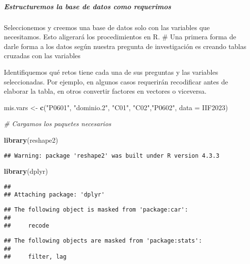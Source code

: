 \documentclass[
]{article}
\newenvironment{Shaded}{\begin{snugshade}}{\end{snugshade}}
\newcommand{\AttributeTok}[1]{\textcolor[rgb]{0.13,0.29,0.53}{#1}}
\newcommand{\CommentTok}[1]{\textcolor[rgb]{0.56,0.35,0.01}{\textit{#1}}}
\newcommand{\FunctionTok}[1]{\textcolor[rgb]{0.13,0.29,0.53}{\textbf{#1}}}
\newcommand{\NormalTok}[1]{#1}
\newcommand{\OtherTok}[1]{\textcolor[rgb]{0.56,0.35,0.01}{#1}}
\newcommand{\StringTok}[1]{\textcolor[rgb]{0.31,0.60,0.02}{#1}}
\begin{document}
\hypertarget{estructuremos-la-base-de-datos-como-requerimos}{%
\subparagraph{Estructuremos la base de datos como
requerimos}\label{estructuremos-la-base-de-datos-como-requerimos}}

Seleccionemos y creemos una base de datos solo con las variables que
necesitamos. Esto aligerará los procedimientos en R. \# Una primera
forma de darle forma a los datos según nuestra pregunta de investigación
es creando tablas cruzadas con las variables

Identifiquemos qué retos tiene cada una de sus preguntas y las variables
seleccionadas. Por ejemplo, en algunos casos requerirán recodificar
antes de elaborar la tabla, en otros convertir factores en vectores o
viceversa.

\begin{Shaded}
\begin{Highlighting}[]
\NormalTok{mis.vars }\OtherTok{\textless{}{-}} \FunctionTok{c}\NormalTok{(}\StringTok{"P0601"}\NormalTok{, }\StringTok{"dominio.2"}\NormalTok{, }\StringTok{"C01"}\NormalTok{, }\StringTok{"C02"}\NormalTok{,}\StringTok{"P0602"}\NormalTok{, }\AttributeTok{data =}\NormalTok{ IIF2023)}


\CommentTok{\# Cargamos los paquetes necesarios}

\FunctionTok{library}\NormalTok{(reshape2)}
\end{Highlighting}
\end{Shaded}

\begin{verbatim}
## Warning: package 'reshape2' was built under R version 4.3.3
\end{verbatim}

\begin{Shaded}
\begin{Highlighting}[]
\FunctionTok{library}\NormalTok{(dplyr)}
\end{Highlighting}
\end{Shaded}

\begin{verbatim}
## 
## Attaching package: 'dplyr'
\end{verbatim}

\begin{verbatim}
## The following object is masked from 'package:car':
## 
##     recode
\end{verbatim}

\begin{verbatim}
## The following objects are masked from 'package:stats':
## 
##     filter, lag
\end{verbatim}
\end{document}
